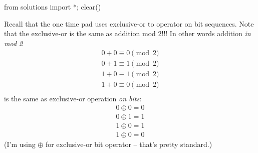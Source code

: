 \begin{python0}
from solutions import *; clear()
\end{python0}

Recall that the
one time pad uses exclusive-or to operator on
bit sequences.
Note that the exclusive-or is the same as
addition mod 2!!!
In other words addition \textit{in mod 2}
\begin{align*}
  0 + 0 \equiv 0 \pmod{2} \\
  0 + 1 \equiv 1 \pmod{2} \\
  1 + 0 \equiv 1 \pmod{2} \\
  1 + 0 \equiv 0 \pmod{2} \\
\end{align*}
is the same as exclusive-or operation \textit{on bits}:
\begin{align*}
  0 \oplus 0 = 0  \\
  0 \oplus 1 = 1  \\
  1 \oplus 0 = 1  \\
  1 \oplus 0 = 0 
\end{align*}
(I'm using $\oplus$ for exclusive-or bit operator -- that's pretty standard.)

